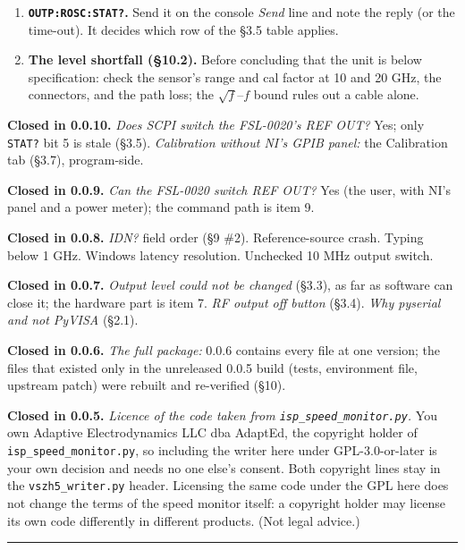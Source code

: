 \documentclass[
\directlua{luaotfload.add_fallback("qsfallback", {"DejaVu Sans:mode=harf;", "DejaVu Sans Mono:mode=harf;", "DejaVu Math TeX Gyre:mode=harf;"})}
  10pt,
  letterpaper,
]{article}
\begin{document}
\begin{enumerate}
  \texttt{FREQ?}, and measure: is 650 MHz reached, or does it clamp near
  656.062 MHz like 100 MHz did? The FSL-0020's lower limit will follow.
\item
  \textbf{\texttt{OUTP:ROSC:STAT?}.} Send it on the console \emph{Send}
  line and note the reply (or the time-out). It decides which row of the
  §3.5 table applies.
\item
  \textbf{The level shortfall (§10.2).} Before concluding that the unit
  is below specification: check the sensor's range and cal factor at 10
  and 20 GHz, the connectors, and the path loss; the \(\sqrt f\)--\(f\)
  bound rules out a cable alone.
\end{enumerate}

\textbf{Closed in 0.0.10.} \emph{Does SCPI switch the FSL-0020's REF
OUT?} Yes; only \texttt{STAT?} bit 5 is stale (§3.5). \emph{Calibration
without NI's GPIB panel:} the Calibration tab (§3.7), program-side.

\textbf{Closed in 0.0.9.} \emph{Can the FSL-0020 switch REF OUT?} Yes
(the user, with NI's panel and a power meter); the command path is item
9.

\textbf{Closed in 0.0.8.} \emph{IDN?} field order (§9 \#2).
Reference-source crash. Typing below 1 GHz. Windows latency resolution.
Unchecked 10 MHz output switch.

\textbf{Closed in 0.0.7.} \emph{Output level could not be changed}
(§3.3), as far as software can close it; the hardware part is item 7.
\emph{RF output off button} (§3.4). \emph{Why pyserial and not PyVISA}
(§2.1).

\textbf{Closed in 0.0.6.} \emph{The full package:} 0.0.6 contains every
file at one version; the files that existed only in the unreleased 0.0.5
build (tests, environment file, upstream patch) were rebuilt and
re-verified (§10).

\textbf{Closed in 0.0.5.} \emph{Licence of the code taken from
\texttt{isp\_speed\_monitor.py}.} You own Adaptive Electrodynamics LLC
dba AdaptEd, the copyright holder of \texttt{isp\_speed\_monitor.py}, so
including the writer here under GPL-3.0-or-later is your own decision
and needs no one else's consent. Both copyright lines stay in the
\texttt{vszh5\_writer.py} header. Licensing the same code under the GPL
here does not change the terms of the speed monitor itself: a copyright
holder may license its own code differently in different products. (Not
legal advice.)

\begin{center}\rule{0.5\linewidth}{0.5pt}\end{center}
\end{document}
